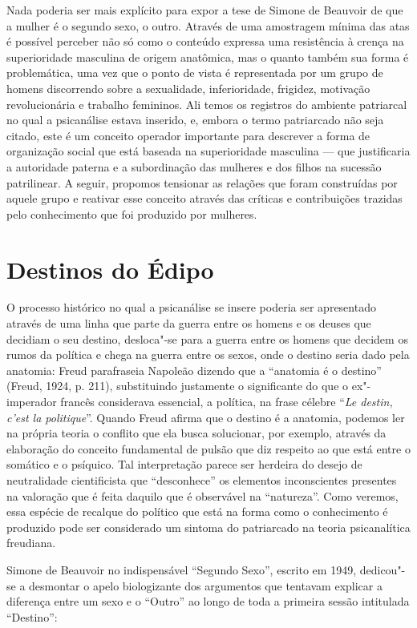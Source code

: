 Nada poderia ser mais explícito para expor a tese de Simone de Beauvoir
de que a mulher é o segundo sexo, o outro. Através de uma amostragem
mínima das atas é possível perceber não só como o conteúdo expressa uma
resistência à crença na superioridade masculina de origem anatômica, mas
o quanto também sua forma é problemática, uma vez que o ponto de vista é
representada por um grupo de homens discorrendo sobre a sexualidade,
inferioridade, frigidez, motivação revolucionária e trabalho femininos.
Ali temos os registros do ambiente patriarcal no qual a psicanálise
estava inserido, e, embora o termo patriarcado não seja citado, este é
um conceito operador importante para descrever a forma de organização
social que está baseada na superioridade masculina --- que justificaria a
autoridade paterna e a subordinação das mulheres e dos filhos na
sucessão patrilinear. A seguir, propomos tensionar as relações que foram
construídas por aquele grupo e reativar esse conceito através das
críticas e contribuições trazidas pelo conhecimento que foi produzido
por mulheres.

\section{Destinos do Édipo}

O processo histórico no qual a psicanálise se insere poderia ser
apresentado através de uma linha que parte da guerra entre os homens e
os deuses que decidiam o seu destino, desloca"-se para a guerra entre os
homens que decidem os rumos da política e chega na guerra entre os
sexos, onde o destino seria dado pela anatomia: Freud parafraseia
Napoleão dizendo que a ``anatomia é o destino'' (Freud, 1924, p. 211),
substituindo justamente o significante do que o ex"-imperador francês
considerava essencial, a política, na frase célebre ``\emph{Le destin,
c'est la politique}''. Quando Freud afirma que o destino é a anatomia,
podemos ler na própria teoria o conflito que ela busca solucionar, por
exemplo, através da elaboração do conceito fundamental de pulsão que diz
respeito ao que está entre o somático e o psíquico. Tal interpretação
parece ser herdeira do desejo de neutralidade cientificista que
``desconhece'' os elementos inconscientes presentes na valoração que é
feita daquilo que é observável na ``natureza''. Como veremos, essa
espécie de recalque do político que está na forma como o conhecimento é
produzido pode ser considerado um sintoma do patriarcado na teoria
psicanalítica freudiana.

Simone de Beauvoir no indispensável ``Segundo Sexo'', escrito em 1949,
dedicou"-se a desmontar o apelo biologizante dos argumentos que tentavam
explicar a diferença entre um sexo e o ``Outro'' ao longo de toda a
primeira sessão intitulada ``Destino'':

